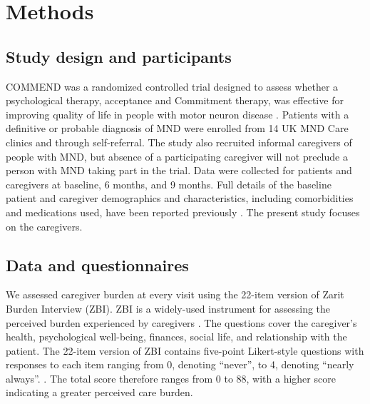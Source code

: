 \documentclass[12pt]{article}
\begin{document}

\section*{Methods} %

\subsection*{Study design and participants}
COMMEND was a randomized controlled trial designed to assess whether a psychological therapy, acceptance and Commitment therapy, was effective for improving quality of life in people with motor neuron disease \parencite{gould_randomised_2022}. Patients with a definitive or probable diagnosis of MND were enrolled from 14 UK MND Care clinics and through self-referral. The study also recruited informal caregivers of people with MND, but absence of a participating caregiver will not preclude a person with MND taking part in the trial. Data were collected for patients and caregivers at  baseline, 6 months, and 9 months. Full details of the baseline patient and caregiver demographics and characteristics, including comorbidities and medications used, have been reported previously \parencite{gould_acceptance_2024, keetharuth_costeffectiveness_2024}. The present study focuses on the caregivers. 

\subsection*{Data and questionnaires}
We assessed caregiver burden at every visit using the 22-item version of Zarit Burden Interview (ZBI). ZBI is a widely-used instrument for assessing the perceived burden experienced by caregivers \parencite{zarit_relatives_1980}. The questions cover the caregiver’s health, psychological well-being, finances, social life, and relationship with the patient. The 22-item version of ZBI contains five-point Likert-style questions with responses to each item ranging from 0, denoting “never”, to 4, denoting “nearly always”. \parencite{zarit_hidden_1985}. The total score therefore ranges from 0 to 88, with a higher score indicating a greater perceived care burden. 
\end{document}
